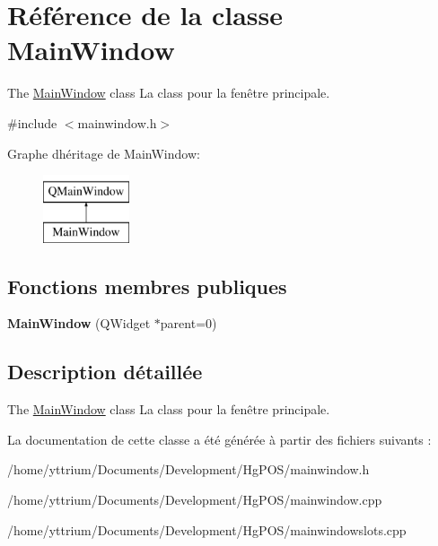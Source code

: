 \hypertarget{classMainWindow}{}\section{Référence de la classe Main\+Window}
\label{classMainWindow}


The \hyperlink{classMainWindow}{Main\+Window} class La class pour la fenêtre principale.  




{\ttfamily \#include $<$mainwindow.\+h$>$}

Graphe d\textquotesingle{}héritage de Main\+Window\+:\begin{figure}[H]
\begin{center}
\leavevmode
\includegraphics[height=2.000000cm]{classMainWindow}
\end{center}
\end{figure}
\subsection*{Fonctions membres publiques}
\begin{DoxyCompactItemize}
\item 
\mbox{\label{classMainWindow_a8b244be8b7b7db1b08de2a2acb9409db}} 
{\bfseries Main\+Window} (Q\+Widget $\ast$parent=0)
\end{DoxyCompactItemize}


\subsection{Description détaillée}
The \hyperlink{classMainWindow}{Main\+Window} class La class pour la fenêtre principale. 

La documentation de cette classe a été générée à partir des fichiers suivants \+:\begin{DoxyCompactItemize}
\item 
/home/yttrium/\+Documents/\+Development/\+Hg\+P\+O\+S/mainwindow.\+h\item 
/home/yttrium/\+Documents/\+Development/\+Hg\+P\+O\+S/mainwindow.\+cpp\item 
/home/yttrium/\+Documents/\+Development/\+Hg\+P\+O\+S/mainwindowslots.\+cpp\end{DoxyCompactItemize}

